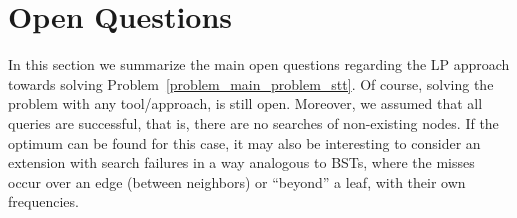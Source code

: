 \section{Open Questions}
\label{section_open_questions}

In this section we summarize the main open questions regarding the LP approach towards solving Problem~\ref{problem_main_problem_stt}. Of course, solving the problem with any tool/approach, is still open. Moreover, we assumed that all queries are successful, that is, there are no searches of non-existing nodes. If the optimum can be found for this case, it may also be interesting to consider an extension with search failures in a way analogous to BSTs, where the misses occur over an edge (between neighbors) or ``beyond'' a leaf, with their own frequencies.

